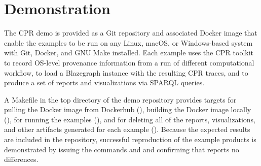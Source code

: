 \section{Demonstration}

The CPR demo is provided as a Git repository and associated Docker image that enable the examples to be run on any Linux, macOS, or Windows-based system with Git, Docker, and GNU Make installed.  Each example uses the CPR toolkit to record OS-level provenance information from a run of different computational workflow, to load a Blazegraph instance with the resulting CPR traces, and to produce a set of reports and visualizations via SPARQL queries.
 
A Makefile in the top directory of the demo repository provides targets for pulling the Docker image from Dockerhub (), building the Docker image locally (), for running the examples (), and for deleting all of the reports, visualizations, and other artifacts generated for each example (). Because the expected results are included in the repository, successful reproduction of the example products is demonstrated by issuing the commands  and  and confirming that  reports no differences.

